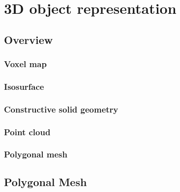 \chapter{3D object representation}

\section{Overview}

\subsection{Voxel map}

\subsection{Isosurface}

\subsection{Constructive solid geometry}

\subsection{Point cloud}

\subsection{Polygonal mesh}

\section{Polygonal Mesh}
